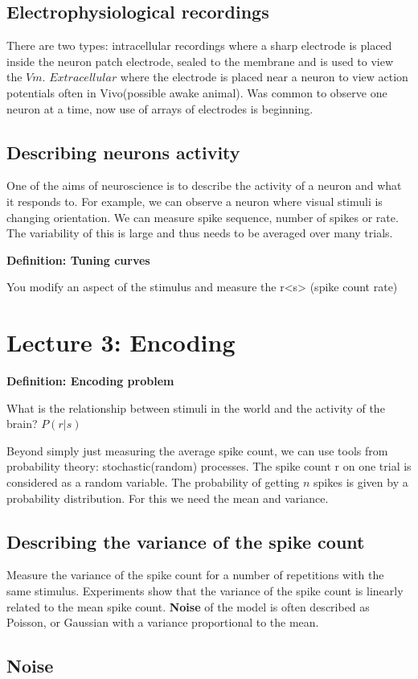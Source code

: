 \documentclass[11pt]{article}
\newcommand{\define}[2] {
  \textbf{Definition: #1}
  \begin{center} #2
\end{center}
}
\begin{document}
\subsection{Electrophysiological recordings}
There are two types: intracellular recordings where a sharp electrode is placed inside the neuron patch electrode, sealed to the membrane and is used to view the $Vm$. $Extracellular$ where the electrode is placed near a neuron to view action potentials often in Vivo(possible awake animal). Was common to observe one neuron at a time, now use of arrays of electrodes is beginning. 

\subsection{Describing neurons activity}
One of the aims of neuroscience is to describe the activity of a neuron and what it responds to. For example, we can observe a neuron where visual stimuli is changing orientation. We can measure spike sequence, number of spikes or rate. The variability of this is large and thus needs to be averaged over many trials.

\define{Tuning curves}{You modify an aspect of the stimulus and measure the r<s> (spike count rate)}

\section{Lecture 3: Encoding}
\define{Encoding problem}{What is the relationship between stimuli in the world and the activity of the brain? $P(r|s)$}

Beyond simply just measuring the average spike count, we can use tools from probability theory: stochastic(random) processes. The spike count r on one trial is considered as a random variable. The probability of getting $n$ spikes is given by a probability distribution. For this we need the mean and variance. 

\subsection{Describing the variance of the spike count}
Measure the variance of the spike count for a number of repetitions with the same stimulus. Experiments show that the variance of the spike count is linearly related to the mean spike count. \textbf{Noise} of the model is often described as Poisson, or Gaussian with a variance proportional to the mean.

\subsection{Noise}
\end{document}
